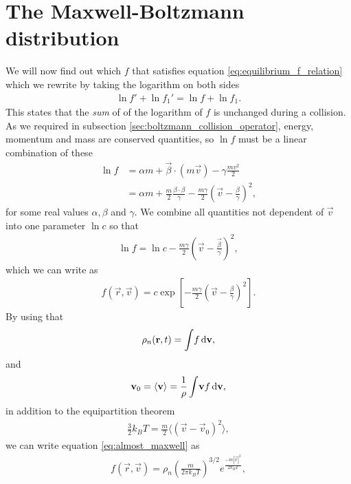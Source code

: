 \section{The Maxwell-Boltzmann distribution}
\label{sec:maxwell_boltzmann_distribution}
We will now find out which $f$ that satisfies equation \eqref{eq:equilibrium_f_relation} which we rewrite by taking the logarithm on both sides
\begin{align}
	\ln f' + \ln f_1' = \ln f + \ln f_1.
\end{align}
This states that the \textit{sum} of of the logarithm of $f$ is unchanged during a collision. As we required in subsection \ref{sec:boltzmann_collision_operator}, energy, momentum and mass are conserved quantities, so $\ln f$ must be a linear combination of these
\begin{align}
	\ln f &= \alpha m + \vec \beta\cdot(m\vec v) - \gamma\frac{mv^2}{2}\\
	&= \alpha m + \frac{m}{2}\frac{\beta\cdot\beta}{\gamma} - \frac{m\gamma}{2}\left(\vec v - \frac{\beta}{\gamma}\right)^2,
\end{align}
for some real values $\alpha, \beta$ and $\gamma$. We combine all quantities not dependent of $\vec v$ into one parameter $\ln c$ so that
\begin{align}
	\ln f = \ln c - \frac{m\gamma}{2}\left(\vec v - \frac{\vec \beta}{\gamma}\right)^2,
\end{align}
which we can write as
\begin{align}
	\label{eq:almost_maxwell}
	f(\vec r, \vec v) = c\exp\left[-\frac{m\gamma}{2}\left(\vec v - \frac{\beta}{\gamma}\right)^2\right].
\end{align}
By using that 
\begin{align}
	\rho_n(\mathbf r, t) = \int\!f \,\mathrm{d}\mathbf v,
\end{align}
and 
\begin{align}
	\mathbf v_0 = \langle \mathbf v\rangle = \frac{1}{\rho}\int\!\mathbf v f\,\mathrm{d}\mathbf v,
\end{align}
in addition to the equipartition theorem
\begin{align}
	\frac{3}{2}k_B T = \frac{m}{2}\langle(\vec v - \vec v_0)^2\rangle,
\end{align}
we can write equation \eqref{eq:almost_maxwell} as \cite{mclennan1989introduction}
\begin{align}
	\label{eq:maxwell_boltzmann_distribution}
	f(\vec r, \vec v) = \rho_n \left(\frac{m}{2\pi k_B T}\right)^{3/2}e^\frac{-m|\vec v|^2}{2k_BT},
\end{align}
